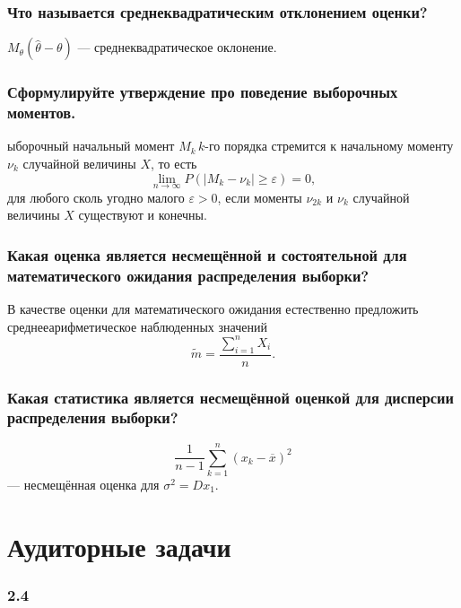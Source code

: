 \subsubsection*{Что называется среднеквадратическим отклонением оценки?}

$M_{ \theta } \left( \hat{ \theta } - \theta \right) $ --- среднеквадратическое оклонение.

\subsubsection*{Сформулируйте утверждение про поведение выборочных моментов.}

ыборочный начальный момент $M_k \, k$-го порядка стремится к начальному моменту $ \nu_k$
случайной величины $X$, то есть
$$ \lim \limits_{n \to \infty } P \left( \left| M_k - \nu_k \right| \geq \varepsilon \right) =
  0,$$
для любого сколь угодно малого $ \varepsilon > 0$,
если моменты $ \nu_{2k}$ и $ \nu_k$ случайной величины $X$ существуют и конечны.

\subsubsection*{Какая оценка является несмещённой и состоятельной для математического ожидания
                распределения выборки?}

В качестве оценки для математического
ожидания естественно предложить среднееарифметическое наблюденных значений
$$ \tilde{m} =
  \frac{ \sum \limits_{i = 1}^n X_i}{n}.$$

\subsubsection*{Какая статистика является несмещённой оценкой для дисперсии распределения выборки?}

$$ \frac{1}{n - 1} \sum \limits_{k = 1}^n \left( x_k - \overline{x} \right)^2$$
--- несмещённая оценка для $ \sigma^2 = Dx_1$.

\section*{Аудиторные задачи}

\subsubsection*{2.4}

